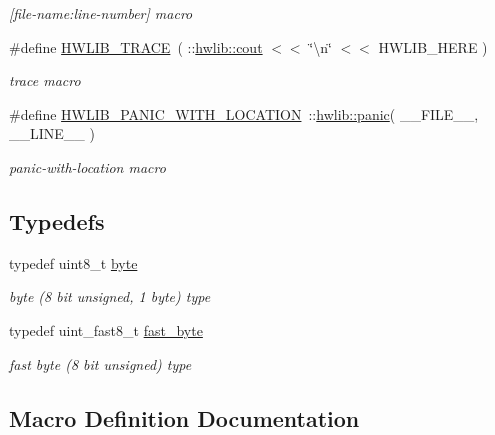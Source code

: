 \begin{DoxyCompactItemize}
\begin{DoxyCompactList}\small\item\em \mbox{[}file-\/name\+:line-\/number\mbox{]} macro \end{DoxyCompactList}\item 
\#define \hyperlink{hwlib-defines_8hpp_a536d8e892418f0e4127db75a6f653add}{H\+W\+L\+I\+B\+\_\+\+T\+R\+A\+CE}~( \+::\hyperlink{namespacehwlib_ac985c212834e4eb219aedede6efff2dc}{hwlib\+::cout} $<$$<$ \char`\"{}\textbackslash{}n\char`\"{} $<$$<$ H\+W\+L\+I\+B\+\_\+\+H\+E\+RE )
\begin{DoxyCompactList}\small\item\em trace macro \end{DoxyCompactList}\item 
\#define \hyperlink{hwlib-defines_8hpp_a63e41f8f1231b208819549fe26a58440}{H\+W\+L\+I\+B\+\_\+\+P\+A\+N\+I\+C\+\_\+\+W\+I\+T\+H\+\_\+\+L\+O\+C\+A\+T\+I\+ON}~\+::\hyperlink{namespacehwlib_adc07d80c1eeeabf8c96b6acbd5dce78f}{hwlib\+::panic}( \+\_\+\+\_\+\+F\+I\+L\+E\+\_\+\+\_\+, \+\_\+\+\_\+\+L\+I\+N\+E\+\_\+\+\_\+ )
\begin{DoxyCompactList}\small\item\em panic-\/with-\/location macro \end{DoxyCompactList}\end{DoxyCompactItemize}
\subsection*{Typedefs}
\begin{DoxyCompactItemize}
\item 
typedef uint8\+\_\+t \hyperlink{hwlib-defines_8hpp_ab8ef12fab634c171394422d0ee8baf94}{byte}
\begin{DoxyCompactList}\small\item\em byte (8 bit unsigned, 1 byte) type \end{DoxyCompactList}\item 
typedef uint\+\_\+fast8\+\_\+t \hyperlink{hwlib-defines_8hpp_a54998f25522db04b7b797b0fcc9eb3d5}{fast\+\_\+byte}
\begin{DoxyCompactList}\small\item\em fast byte (8 bit unsigned) type \end{DoxyCompactList}\end{DoxyCompactItemize}


\subsection{Macro Definition Documentation}
